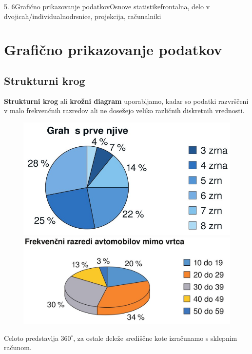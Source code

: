 \begin{priprava}{5. 6}{}{Grafično prikazovanje podatkov}{Osnove statistike}{frontalna, delo v dvojicah/individualno}{drsnice, projekcija, računalniki}

    \section{Grafično prikazovanje podatkov}
                

    \subsection*{Strukturni krog}
    
        \textbf{Strukturni krog} ali \textbf{krožni diagram} uporabljamo, kadar so podatki razvrščeni v malo frekvenčnih razredov 
        ali ne dosežejo veliko različnih diskretnih vrednosti.
    
        \begin{figure}[H]
            \includegraphics[scale=0.3]{../../Slike_in_skice/10921.jpg}
            \includegraphics[scale=0.3]{../../Slike_in_skice/1092.jpg}
        \end{figure}

    
        Celoto predstavlja $360^\circ$, za ostale deleže središčne kote izračunamo s sklepnim računom.
    

\end{priprava}
